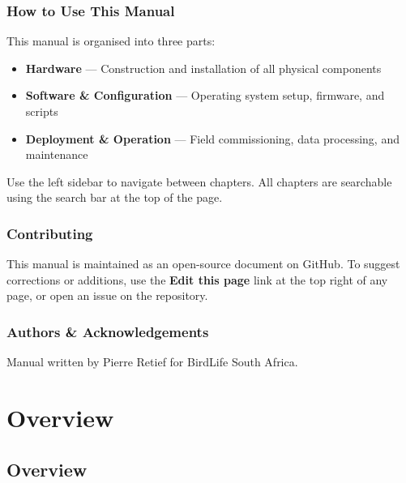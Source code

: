 \documentclass[
  letterpaper,
]{scrbook}
\providecommand{\tightlist}{%
  \setlength{\itemsep}{0pt}\setlength{\parskip}{0pt}}
\begin{document}
\section*{How to Use This Manual}\label{how-to-use-this-manual}


This manual is organised into three parts:

\begin{itemize}
\tightlist
\item
  \textbf{Hardware} --- Construction and installation of all physical
  components
\item
  \textbf{Software \& Configuration} --- Operating system setup,
  firmware, and scripts
\item
  \textbf{Deployment \& Operation} --- Field commissioning, data
  processing, and maintenance
\end{itemize}

Use the left sidebar to navigate between chapters. All chapters are
searchable using the search bar at the top of the page.

\section*{Contributing}\label{contributing}


This manual is maintained as an open-source document on GitHub. To
suggest corrections or additions, use the \textbf{Edit this page} link
at the top right of any page, or open an issue on the repository.

\section*{Authors \& Acknowledgements}\label{authors-acknowledgements}


Manual written by Pierre Retief for BirdLife South Africa.

\part{Overview}

\chapter{Overview}\label{overview-1}
\end{document}
